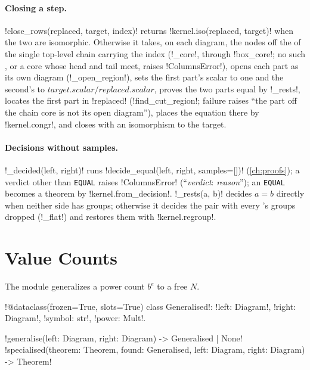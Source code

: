 \paragraph{Closing a step.} \py!close_rows(replaced, target, index)! returns \py!kernel.iso(replaced, target)! when the two are isomorphic. Otherwise it takes, on each diagram, the nodes off the  of the single top-level chain \bbox{} carrying the index (\py!_core!, through \py!box_core!; no such \bbox{}, or a core whose head and tail meet, raises \py!ColumnsError!), opens each part as its own diagram (\py!_open_region!), sets the first part's scalar to one and the second's to $\textit{target.scalar}/\textit{replaced.scalar}$, proves the two parts equal by \py!_rests!, locates the first part in \py!replaced! (\py!find_cut_region!; failure raises ``the part off the chain core is not its open diagram''), places the equation there by \py!kernel.congr!, and closes with an isomorphism to the target.

\paragraph{Decisions without samples.} \py!_decided(left, right)! runs \py!decide_equal(left, right, samples=[])! (\cref{ch:proofs}); a verdict other than \texttt{EQUAL} raises \py!ColumnsError! (``\textit{verdict}: \textit{reason}''); an \texttt{EQUAL} becomes a theorem by \py!kernel.from_decision!. \py!_rests(a, b)! decides $a=b$ directly when neither side has \bbox{} groups; otherwise it decides the pair with every \bbox{}'s groups dropped (\py!_flat!) and restores them with \py!kernel.regroup!.

\section{Value Counts}\label{sec:semantics-valuecount}

The module  generalizes a power \bbox{} count $b^e$ to a free  $N$.

\begin{signature}
\py!@dataclass(frozen=True, slots=True) class Generalised!: \py!left: Diagram!, \py!right: Diagram!, \py!symbol: str!, \py!power: Mult!.

\py!generalise(left: Diagram, right: Diagram) -> Generalised | None!\\
\py!specialised(theorem: Theorem, found: Generalised, left: Diagram, right: Diagram) -> Theorem!
\end{signature}

